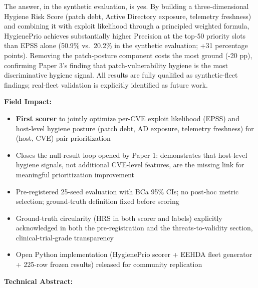 \documentclass[12pt,letterpaper]{article}
\begin{document}
The answer, in the synthetic evaluation, is yes. By building a three-dimensional
Hygiene Risk Score (patch debt, Active Directory exposure, telemetry freshness)
and combining it with exploit likelihood through a principled weighted formula,
HygienePrio achieves substantially higher Precision at the top-50 priority slots
than EPSS alone (50.9\% vs.\ 20.2\% in the synthetic evaluation; +31 percentage
points). Removing the patch-posture component costs the most ground (-20 pp),
confirming Paper 3's finding that patch-vulnerability hygiene is the most
discriminative hygiene signal. All results are fully qualified as synthetic-fleet
findings; real-fleet validation is explicitly identified as future work.

\vspace{0.5em}
\noindent\textbf{Field Impact:}
\begin{itemize}[leftmargin=*,itemsep=2pt]
  \item \textbf{First scorer} to jointly optimize per-CVE exploit likelihood
        (EPSS) and host-level hygiene posture (patch debt, AD exposure,
        telemetry freshness) for (host, CVE) pair prioritization
  \item Closes the null-result loop opened by Paper 1: demonstrates that
        host-level hygiene signals, not additional CVE-level features, 
        are the missing link for meaningful prioritization improvement
  \item Pre-registered 25-seed evaluation with BCa 95\% CIs; no post-hoc
        metric selection; ground-truth definition fixed before scoring
  \item Ground-truth circularity (HRS in both scorer and labels)
        explicitly acknowledged in both the pre-registration and the
        threats-to-validity section, clinical-trial-grade transparency
  \item Open Python implementation (HygienePrio scorer + EEHDA fleet generator
        + 225-row frozen results) released for community replication
\end{itemize}

\vspace{0.5em}
\noindent\textbf{Technical Abstract:}
\end{document}
